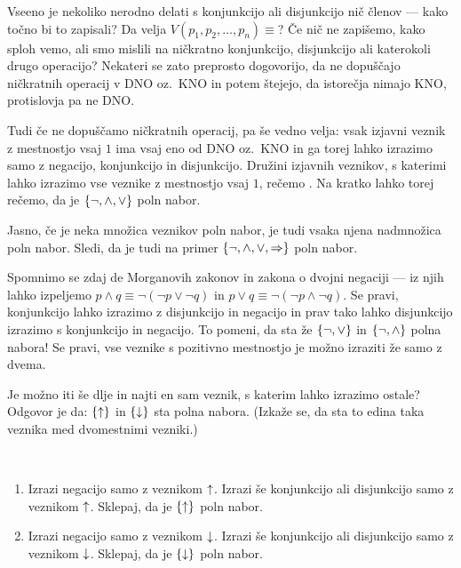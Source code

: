                 Vseeno je nekoliko nerodno delati s konjunkcijo ali disjunkcijo nič členov --- kako točno bi to zapisali? Da velja $V(p_1, p_2, \ldots, p_n) \equiv $? Če nič ne zapišemo, kako sploh vemo, ali smo mislili na ničkratno konjunkcijo, disjunkcijo ali katerokoli drugo operacijo? Nekateri se zato preprosto dogovorijo, da ne dopuščajo ničkratnih operacij v DNO oz.~KNO in potem štejejo, da istorečja nimajo KNO, protislovja pa ne DNO.

                Tudi če ne dopuščamo ničkratnih operacij, pa še vedno velja: vsak izjavni veznik z mestnostjo vsaj $1$ ima vsaj eno od DNO oz.~KNO in ga torej lahko izrazimo samo z negacijo, konjunkcijo in disjunkcijo. Družini izjavnih veznikov, s katerimi lahko izrazimo vse veznike z mestnostjo vsaj $1$, rečemo . Na kratko lahko torej rečemo, da je $\set{\lnot, \land, \lor}$ poln nabor.

                Jasno, če je neka množica veznikov poln nabor, je tudi vsaka njena nadmnožica poln nabor. Sledi, da je tudi na primer $\set{\lnot, \land, \lor, \impl}$ poln nabor.

                Spomnimo se zdaj de Morganovih zakonov in zakona o dvojni negaciji --- iz njih lahko izpeljemo $p \land q \equiv \lnot(\lnot{p} \lor \lnot{q})$ in $p \lor q \equiv \lnot(\lnot{p} \land \lnot{q})$. Se pravi, konjunkcijo lahko izrazimo z disjunkcijo in negacijo in prav tako lahko disjunkcijo izrazimo s konjunkcijo in negacijo. To pomeni, da sta že $\set{\lnot, \lor}$ in $\set{\lnot, \land}$ polna nabora! Se pravi, vse veznike s pozitivno mestnostjo je možno izraziti že samo z dvema.

                Je možno iti še dlje in najti en sam veznik, s katerim lahko izrazimo ostale? Odgovor je da: $\set{\shf}$ in $\set{\luk}$ sta polna nabora. (Izkaže se, da sta to edina taka veznika med dvomestnimi vezniki.)

                \begin{naloga}\label{naloga:polni-nabori-z-enim-veznikom}
                        \
                        \begin{enumerate}
                                \item
                                        Izrazi negacijo samo z veznikom $\mathbin{\uparrow}$. Izrazi še konjunkcijo ali disjunkcijo samo z veznikom $\mathbin{\uparrow}$. Sklepaj, da je $\set{\shf}$ poln nabor.
                                \item
                                        Izrazi negacijo samo z veznikom $\mathbin{\downarrow}$. Izrazi še konjunkcijo ali disjunkcijo samo z veznikom $\mathbin{\downarrow}$. Sklepaj, da je $\set{\luk}$ poln nabor.
                        \end{enumerate}
                \end{naloga}

